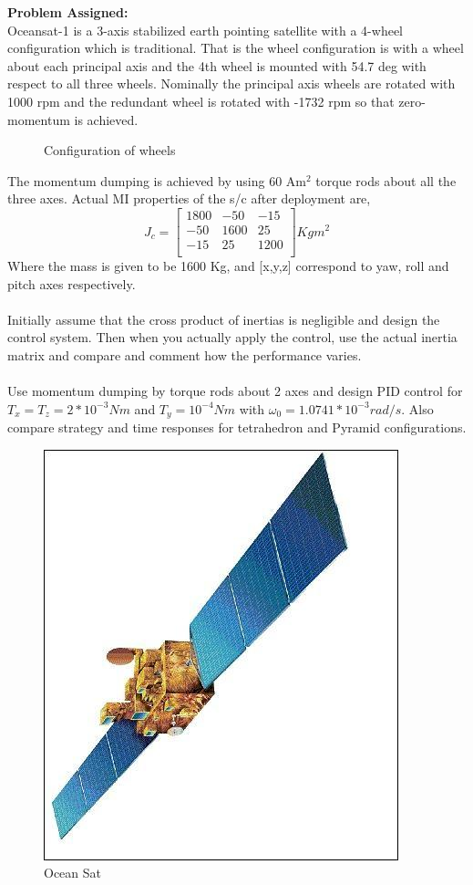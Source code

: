 \documentclass[10pt,a4paper]{report}
\begin{document}
\textbf{Problem Assigned:}\\
Oceansat-1 is a 3-axis stabilized earth pointing satellite with a 4-wheel configuration which is traditional. That is the wheel configuration is with a wheel about each principal axis and the 4th wheel is mounted with 54.7 deg with respect to all three wheels. Nominally the principal axis wheels are rotated with 1000 rpm and the redundant wheel is rotated with -1732 rpm so that zero-momentum is achieved.
\begin{figure}[H]
\centering

\caption{Configuration of wheels}
\end{figure}
The momentum dumping is achieved by using 60 Am$ ^{2} $ torque rods about all the three axes. Actual MI properties of the s/c after deployment are,
\begin{equation}
J_{c}=\begin{bmatrix}
1800 & -50 & -15 \\
-50 & 1600 & 25 \\
-15 & 25 & 1200 \\
\end{bmatrix} Kg m^{2}
\end{equation}
Where the mass is given to be 1600 Kg, and [x,y,z] correspond to yaw, roll and pitch axes respectively.\\ \\
Initially assume that the cross product of inertias is negligible and design
the control system. Then when you actually apply the control, use the
actual inertia matrix and compare and comment how the performance
varies.
\\ \\
Use momentum dumping by torque rods about 2 axes and design PID control for $ T_{x}= T_{z}=2*10^{-3}Nm $ and $ T_{y}=10^{-4}Nm $ with $ \omega_{0}= 1.0741*10^{-3} rad/s $.
Also compare strategy and time responses for tetrahedron and Pyramid configurations.
\\\begin{figure}[H]
\centering
\includegraphics[scale=0.5]{image_gallery.png}
\caption{Ocean Sat}
\end{figure}
\end{document}
